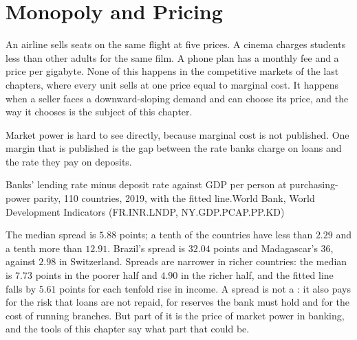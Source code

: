 \chapter{Monopoly and Pricing}\label{ch:b1:monopoly-pricing}

An airline sells seats on the same flight at five prices. A cinema charges
students less than other adults for the same film. A phone plan has a
monthly fee and a price per gigabyte. None of this happens in the
competitive markets of the last chapters, where every unit sells at one
price equal to marginal cost. It happens when a seller faces a
downward-sloping demand and can choose its price, and the way it chooses is
the subject of this chapter.

Market power is hard to see directly, because marginal cost is not
published. One margin that is published is the gap between the rate banks
charge on loans and the rate they pay on deposits.

\begin{openingchart}{Banks' lending rate minus deposit rate against GDP per
person at purchasing-power parity, 110 countries, 2019, with the fitted
line.}{World Bank, World Development Indicators (FR.INR.LNDP,
NY.GDP.PCAP.PP.KD)}
\end{openingchart}

The median spread is $5.88$ points; a tenth of the countries have less than
$2.29$ and a tenth more than $12.91$. Brazil's spread is $32.04$ points and
Madagascar's $36$, against $2.98$ in Switzerland. %
Spreads are narrower in richer countries: the median is $7.73$ points in the
poorer half and $4.90$ in the richer half, and the fitted line falls by $5.61$
points for each tenfold rise in income. %
A spread is not a : it also pays for the risk that loans are not
repaid, for reserves the bank must hold and for the cost of running
branches. But part of it is the price of market power in banking, and the
tools of this chapter say what part that could be.

